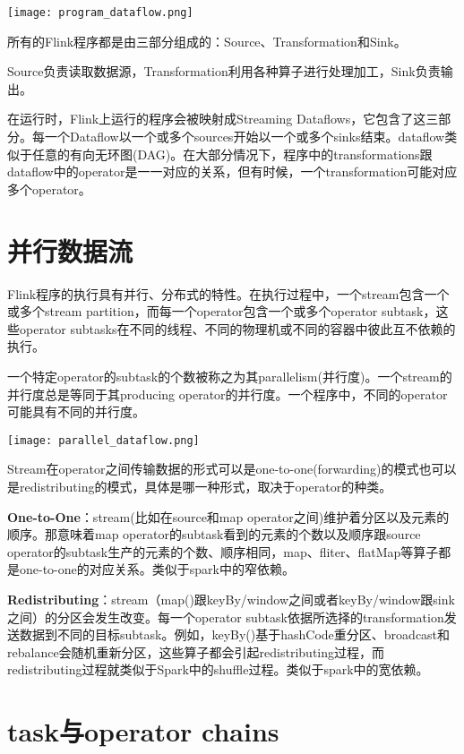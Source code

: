 \documentclass[oneside]{ctexbook}
\begin{document}
\noindent \texttt{[image: program\_dataflow.png]}

所有的Flink程序都是由三部分组成的：Source、Transformation和Sink。

Source负责读取数据源，Transformation利用各种算子进行处理加工，Sink负责输出。

在运行时，Flink上运行的程序会被映射成Streaming Dataflows，它包含了这三部分。每一个Dataflow以一个或多个sources开始以一个或多个sinks结束。dataflow类似于任意的有向无环图(DAG)。在大部分情况下，程序中的transformations跟dataflow中的operator是一一对应的关系，但有时候，一个transformation可能对应多个operator。

\section{并行数据流}

Flink程序的执行具有并行、分布式的特性。在执行过程中，一个stream包含一个或多个stream partition，而每一个operator包含一个或多个operator subtask，这些operator subtasks在不同的线程、不同的物理机或不同的容器中彼此互不依赖的执行。

一个特定operator的subtask的个数被称之为其parallelism(并行度)。一个stream的并行度总是等同于其producing operator的并行度。一个程序中，不同的operator可能具有不同的并行度。

\noindent \texttt{[image: parallel\_dataflow.png]}

Stream在operator之间传输数据的形式可以是one-to-one(forwarding)的模式也可以是redistributing的模式，具体是哪一种形式，取决于operator的种类。

\textbf{One-to-One}：stream(比如在source和map operator之间)维护着分区以及元素的顺序。那意味着map operator的subtask看到的元素的个数以及顺序跟source operator的subtask生产的元素的个数、顺序相同，map、fliter、flatMap等算子都是one-to-one的对应关系。类似于spark中的窄依赖。

\sloppy
\textbf{Redistributing}：stream（map()跟keyBy/window之间或者keyBy/window跟sink之间）的分区会发生改变。每一个operator subtask依据所选择的transformation发送数据到不同的目标subtask。例如，keyBy()基于hashCode重分区、broadcast和rebalance会随机重新分区，这些算子都会引起redistributing过程，而redistributing过程就类似于Spark中的shuffle过程。类似于spark中的宽依赖。

\section{task与operator chains}
\end{document}
